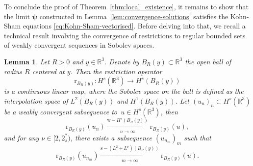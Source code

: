 \documentclass[12pt,a4paper]{amsart}
\newtheorem{lemma}[theorem]{Lemma}
\numberwithin{equation}{section}
\newcommand{\ulpsi}{\boldsymbol{\psi}}
\newcommand{\twoasts}{{2^*_s}}
\begin{document}
	To conclude the proof of Theorem~\ref{thm:local_existence}, it remains to show that the limit $\ulpsi$ constructed in Lemma~\ref{lem:convergence-solutions} satisfies the Kohn-Sham equations \eqref{eq:Kohn-Sham-vectorised}. Before delving into that, we recall a technical result involving the convergence of restrictions to regular bounded sets of weakly convergent sequences in Sobolev spaces.
	
	\begin{lemma}
		\label{lem:restriction}
		Let $R>0$ and $ y \in \mathbb{R}^3$. Denote by $ B_R(y) \subset \mathbb{R}^3 $ the open ball of radius $R$ centered at $y$. Then the restriction operator 
		\begin{equation}
			\mathrm{r}_{B_R(y)}: H^s(\mathbb{R}^3) \rightarrow H^s(B_R(y))
		\end{equation}
		is a continuous linear map, where the Sobolev space on the ball is defined as the interpolation space of $L^2(B_R(y))$ and $ H^1(B_R(y))$.
		Let $(u_n)_n \subset H^s(\mathbb{R}^3) $ be a weakly convergent subsequence to~$u \in H^s(\mathbb{R}^3)$, then 
		\begin{equation}
			\mathrm{r}_{B_R(y)} (u_n) \xrightarrow[n\to\infty] {\mathrm{w}-H^s(B_R(y))} \mathrm{r}_{B_R(y)} (u) ,
		\end{equation}
		and for any $\nu \in [2, \twoasts  ) $, there exists a subsequence $(u_{n_m})_m$ such that
		\begin{equation}
			\mathrm{r}_{B_R(y)} (u_{n_m}) \xrightarrow[m\to\infty]{\mathrm{s}-(L^2+L^\nu)(B_R(y))} \mathrm{r}_{B_R(y)}(u).
		\end{equation}
	\end{lemma}
\end{document}
